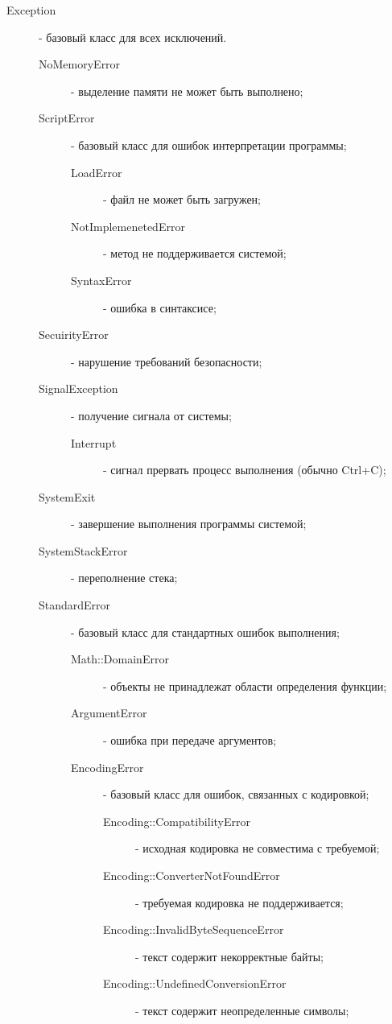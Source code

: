 \begin{description}
  \item[Exception] - базовый класс для всех исключений.
  \begin{description}
    \item[NoMemoryError] - выделение памяти не может быть выполнено;

    \item[ScriptError]- базовый класс для ошибок интерпретации программы;

    \begin{description}
      \item[LoadError] - файл не может быть загружен;
      \item[NotImplemenetedError] - метод не поддерживается системой;
      \item[SyntaxError] - ошибка в синтаксисе;
    \end{description}

    \item[SecuirityError] - нарушение требований безопасности;

    \item[SignalException] - получение сигнала от системы;
    \begin{description}
      \item[Interrupt] - сигнал прервать процесс выполнения (обычно Ctrl+C);
    \end{description}

    \item[SystemExit] - завершение выполнения программы системой;

    \item[SystemStackError] - переполнение стека;

    \item[StandardError] - базовый класс для стандартных ошибок выполнения;
    \begin{description}
      \item[Math::DomainError] - объекты не принадлежат области определения функции;

      \item[ArgumentError] - ошибка при передаче аргументов;

      \item[EncodingError] - базовый класс для ошибок, связанных с кодировкой;
      \begin{description}
        \item[Encoding::CompatibilityError] - исходная кодировка не совместима с требуемой;
        \item[Encoding::ConverterNotFoundError] - требуемая кодировка не поддерживается;
        \item[Encoding::InvalidByteSequenceError] - текст содержит некорректные байты;
        \item[Encoding::UndefinedConversionError] - текст содержит неопределенные символы;
      \end{description}


\end{description}
\end{description}
\end{description}
